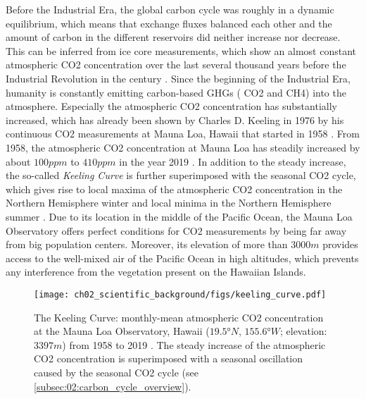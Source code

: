 Before the Industrial Era, the global carbon cycle was roughly in a dynamic
equilibrium, which means that exchange fluxes balanced each other and the
amount of carbon in the different reservoirs did neither increase nor decrease.
This can be inferred from ice core measurements, which show an almost constant
atmospheric \ac{CO2} concentration over the last several thousand years before
the Industrial Revolution in the  century \autocite{Ciais2013}. Since
the beginning of the Industrial Era, humanity is constantly emitting
carbon-based \acp{GHG} (\eg{} \ac{CO2} and \ac{CH4}) into the atmosphere.
Especially the atmospheric \ac{CO2} concentration has substantially increased,
which has already been shown by Charles D. Keeling in 1976 by his continuous
\ac{CO2} measurements at Mauna Loa, Hawaii that started in 1958
. From 1958, the
atmospheric \ac{CO2} concentration at Mauna Loa has steadily increased by about
$100 \unit{ppm}$ to $410 \unit{ppm}$ in the year 2019 \autocite{Keeling2005}.
In addition to the steady increase, the so-called \emph{Keeling Curve} is
further superimposed with the seasonal \ac{CO2} cycle, which gives rise to
local maxima of the atmospheric \ac{CO2} concentration in the Northern
Hemisphere winter and local minima in the Northern Hemisphere summer
. Due to
its location in the middle of the Pacific Ocean, the Mauna Loa Observatory
offers perfect conditions for \ac{CO2} measurements by being far away from big
population centers. Moreover, its elevation of more than $3000 \unit{m}$
provides access to the well-mixed air of the Pacific Ocean in high altitudes,
which prevents any interference from the vegetation present on the Hawaiian
Islands.

\begin{figure}[t]
  \centering
  \texttt{[image: 
    ch02\_scientific\_background/figs/keeling\_curve.pdf]}
  \caption{The Keeling Curve: monthly-mean atmospheric \acs{CO2} concentration
    at the Mauna Loa Observatory, Hawaii ($19.5 \unit{\degree N}$, $155.6
    \unit{\degree W}$; elevation: $3397 \unit{m}$) from 1958 to 2019
    \autocite{Keeling2005}. The steady increase of the atmospheric \acs{CO2}
    concentration is superimposed with a seasonal oscillation caused by the
    seasonal \acs{CO2} cycle (see \cref{subsec:02:carbon_cycle_overview}).}
  \label{fig:02:keeling_curve}
\end{figure}

